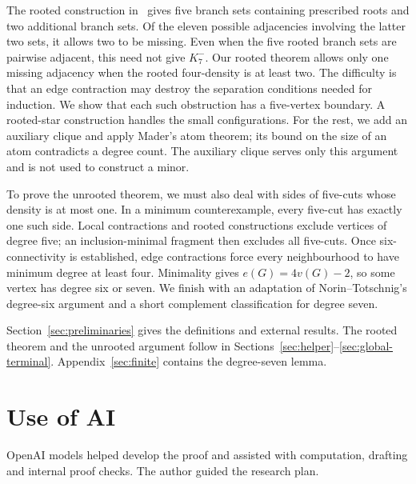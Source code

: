 \documentclass[11pt,a4paper]{amsart}
\theoremstyle{definition}
\theoremstyle{remark}
\begin{document}
The rooted construction in~\cite[Theorem~2.9]{DNR2026} gives five
branch sets containing prescribed roots and two additional branch sets.
Of the eleven possible adjacencies involving the latter two sets, it
allows two to be missing. Even when the five rooted branch sets are
pairwise adjacent, this need not give $K_7^{-}$. Our rooted theorem
allows only one missing adjacency when the rooted four-density is at
least two. The difficulty is that an edge contraction may destroy the
separation conditions needed for induction. We show that each such
obstruction has a five-vertex boundary. A rooted-star construction
handles the small configurations. For the rest, we add an auxiliary
clique and apply Mader's atom theorem; its bound on the size of an atom
contradicts a degree count. The auxiliary clique serves only this
argument and is not used to construct a minor.

To prove the unrooted theorem, we must also deal with sides of five-cuts
whose density is at most one. In a minimum counterexample, every five-cut
has exactly one such side. Local contractions and rooted constructions
exclude vertices of degree five; an inclusion-minimal fragment then
excludes all five-cuts. Once six-connectivity is established, edge
contractions force every neighbourhood to have minimum degree at least
four. Minimality gives $e(G)=4v(G)-2$, so some vertex has degree six or seven.
We finish with an adaptation of Norin--Totschnig's degree-six argument
and a short complement classification for degree seven.

Section~\ref{sec:preliminaries} gives the definitions and external
results. The rooted theorem and the unrooted argument follow in
Sections~\ref{sec:helper}--\ref{sec:global-terminal}.
Appendix~\ref{sec:finite} contains the degree-seven lemma.

\clearpage




\appendix


\section*{Use of AI}
OpenAI models helped develop the proof and assisted with computation,
drafting and internal proof checks. The author guided the research plan.


\begingroup
\raggedright

\endgroup
\end{document}
